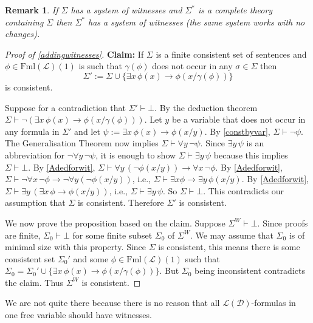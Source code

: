 \documentclass[11pt]{article}
\newcommand{\proves}{\vdash}
\newcommand{\Fml}{\textrm{Fml}}
\newtheorem{remark}[theorem]{Remark}
\newcommand{\mcal}[1]{\mathcal{#1}}
\begin{document}
\begin{remark}
If $\Sigma$ has a system of witnesses and $\Sigma^*$ is a complete theory containing $\Sigma$ then $\Sigma^*$ has a system of witnesses (the same system works with no changes).
\end{remark}

\begin{proof}[Proof of \ref{addingwitnesses}]
\medskip

\noindent
\textbf{Claim:} If $\Sigma$ is a finite consistent set of sentences and $\phi\in\Fml(\mcal{L})(1)$ is such that $\gamma(\phi)$ does not occur in any $\sigma\in\Sigma$ then
\[\Sigma':=\Sigma\cup \{\exists x\,\phi(x)\rightarrow \phi(x/\gamma(\phi))\}\] is consistent.

Suppose for a contradiction that $\Sigma'\proves \bot$. By the deduction theorem $\Sigma\proves \neg(\exists x\,\phi(x)\rightarrow \phi(x/\gamma(\phi)))$. Let $y$ be a variable that does not occur in any formula in $\Sigma'$ and let $\psi:=\exists x\,\phi(x)\rightarrow \phi(x/y)$.
By \ref{constbyvar}, $\Sigma\proves \neg \psi$. The Generalisation Theorem now implies $\Sigma\proves \forall y \, \neg\psi$.
Since $\exists y\,\psi$ is an abbreviation for $\neg\forall y\, \neg\psi$, it is enough to show $\Sigma \proves \exists y\,\psi$ because this implies $\Sigma\proves \bot$. By \ref{Adedforwit}, $\Sigma\proves \forall y\,(\neg\phi(x/y))\rightarrow \forall x\, \neg\phi$.
By \ref{Adedforwit}, $\Sigma\proves \neg\forall x\,\neg\phi\rightarrow \neg\forall y(\neg \phi(x/y))$, i.e., $\Sigma\proves \exists x\phi\rightarrow \exists y\, \phi(x/y)$.
By \ref{Adedforwit}, $\Sigma\proves \exists y\, (\exists x\,\phi\rightarrow \phi(x/y))$, i.e., $\Sigma\proves \exists y\, \psi$. So $\Sigma\proves \bot$. This contradicts our assumption that $\Sigma$ is consistent. Therefore $\Sigma'$ is consistent.

We now prove the proposition based on the claim. Suppose $\Sigma^W\proves\bot$. Since proofs are finite, $\Sigma_0\proves \bot$ for some finite subset $\Sigma_0$ of $\Sigma^W$. We may assume that $\Sigma_0$ is of minimal size with this property. Since $\Sigma$ is consistent, this means there is some consistent set $\Sigma_0'$ and some $\phi\in \Fml(\mcal{L})(1)$ such that $\Sigma_0=\Sigma_0'\cup\{\exists x\,\phi(x)\rightarrow \phi(x/\gamma(\phi))\}$. But $\Sigma_0$ being inconsistent contradicts the claim. Thus $\Sigma^W$ is consistent.
\end{proof}

We are not quite there because there is no reason that all $\mcal{L}(\mcal{D})$-formulas in one free variable should have witnesses.
\end{document}
